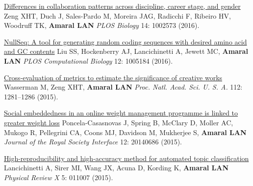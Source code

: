 \NumberedItem{\makebox[0.8cm][r]{[117]}}
\href{/people/amaral/differences-collaboration-patterns-across-discipline-career-stage-and-gender}
{Differences in collaboration patterns across discipline, career stage, and gender}
\newline
Zeng XHT, Duch J, Sales-Pardo M, Moreira JAG, Radicchi F, Ribeiro HV, Woodruff TK, {\textbf{Amaral LAN}}
\newline
\textit{PLOS Biology}
    14:
1002573 (2016).
\newline
\Gap
~
\Gap

\NumberedItem{\makebox[0.8cm][r]{[116]}}
\href{/people/amaral/nullseq-tool-generating-random-coding-sequences-desired-amino-acid-and-gc-contents}
{NullSeq: A tool for generating random coding sequences with desired amino acid and GC contents}
\newline
Liu SS, Hockenberry AJ, Lancichinetti A, Jewett MC, {\textbf{Amaral LAN}}
\newline
\textit{PLOS Computational Biology}
    12:
1005184 (2016).
\newline
\Gap
~
\Gap

\NumberedItem{\makebox[0.8cm][r]{[115]}}
\href{/people/amaral/cross-evaluation-metrics-estimate-significance-creative-works}
{Cross-evaluation of metrics to estimate the significance of creative works}
\newline
Wasserman M, Zeng XHT, {\textbf{Amaral LAN}}
\newline
\textit{Proc. Natl. Acad. Sci. U. S. A.}
    112:
1281--1286 (2015).
\newline
\Gap
~
\Gap

\NumberedItem{\makebox[0.8cm][r]{[114]}}
\href{/people/amaral/social-embeddedness-online-weight-management-programme-linked-greater-weight-loss}
{Social embeddedness in an online weight management programme is linked to greater weight loss}
\newline
Poncela-Casasnovas J, Spring B, McClary D, Moller AC, Mukogo R, Pellegrini CA, Coons MJ, Davidson M, Mukherjee S, {\textbf{Amaral LAN}}
\newline
\textit{Journal of the Royal Society Interface}
    12:
20140686 (2015).
\newline
\Gap
~
\Gap

\NumberedItem{\makebox[0.8cm][r]{[113]}}
\href{/people/amaral/high-reproducibility-and-high-accuracy-method-automated-topic-classification}
{High-reproducibility and high-accuracy method for automated topic classification}
\newline
Lancichinetti A, Sirer MI, Wang JX, Acuna D, Kording K, {\textbf{Amaral LAN}}
\newline
\textit{Physical Review X}
    5:
011007 (2015).
\newline
\Gap
~
\Gap

